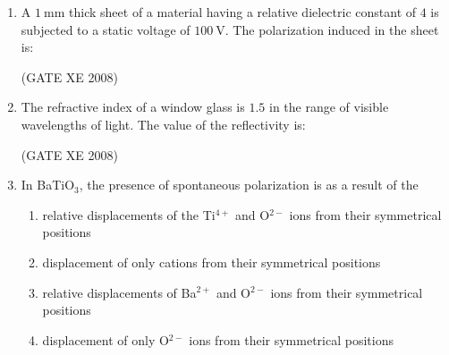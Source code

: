 \documentclass[12pt]{article}
\begin{document}
\begin{enumerate}
(GATE XE 2008)

\item A $1 \ \mathrm{mm}$ thick sheet of a material having a relative dielectric constant of $4$ is subjected to a static voltage of $100 \ \mathrm{V}$. The polarization induced in the sheet is:

\begin{enumerate}
\end{enumerate}

(GATE XE 2008)

\item The refractive index of a window glass is $1.5$ in the range of visible wavelengths of light. The value of the reflectivity is:

\begin{enumerate}
\end{enumerate}

(GATE XE 2008)

\item In BaTiO$_3$, the presence of spontaneous polarization is as a result of the

\begin{enumerate}

\item  relative displacements of the Ti$^{4+}$ and O$^{2-}$ ions from their symmetrical positions 
\item  displacement of only cations from their symmetrical positions
\item  relative displacements of Ba$^{2+}$ and O$^{2-}$ ions from their symmetrical positions
\item  displacement of only O$^{2-}$ ions from their symmetrical positions
\end{enumerate}


\end{enumerate}
\end{document}

